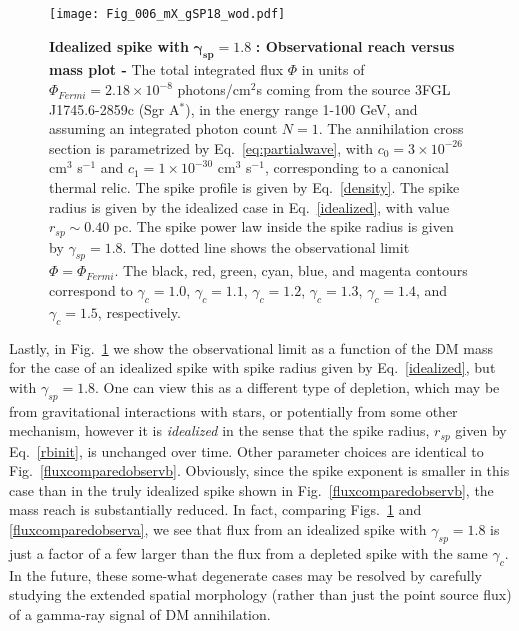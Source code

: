 \documentclass[11pt]{article}
\begin{document}
  \begin{figure}[ht]
  \centering
  {\texttt{[image: Fig\_006\_mX\_gSP18\_wod.pdf]}}
    \caption{\textbf{Idealized spike with} $\mathbf{\gamma_{sp} = 1.8}$ \textbf{: Observational reach versus mass plot - } The total integrated flux $\Phi$ in units of  $ \Phi_{Fermi} = 2.18 \times 10^{-8}$ photons/cm$^2$s coming from the source 3FGL J1745.6-2859c (Sgr A$^*$), in the energy range 1-100 GeV, and assuming an integrated photon count $N=1$. The annihilation cross section is parametrized by Eq.~\ref{eq:partialwave}, with $c_0 = 3 \times 10^{-26}$ cm$^{3}$ s$^{-1}$ and $c_1 = 1 \times 10^{-30}$ cm$^{3}$ s$^{-1}$, corresponding to a canonical thermal relic. The spike profile is given by Eq.~\ref{density}. The spike radius is given by the idealized case in Eq.~\ref{idealized}, with value $r_{sp} \sim 0.40$ pc. The spike power law inside the spike radius is given by $\gamma_{sp} = 1.8$. The dotted line shows the observational limit $\Phi = \Phi_{Fermi}$.  The black, red, green, cyan, blue, and magenta contours correspond to $\gamma_c = 1.0$, $\gamma_c = 1.1$, $\gamma_c = 1.2$, $\gamma_c = 1.3$,  $\gamma_c = 1.4$, and  $\gamma_c = 1.5$, respectively.}
    \label{fluxcomparedobservc}
\end{figure}

Lastly, in Fig.~\ref{fluxcomparedobservc} we show the observational limit as a function of the DM mass for the case of an idealized spike with spike radius given by Eq.~\ref{idealized}, but with $\gamma_{sp} = 1.8$.  One can view this as a different type of depletion, which may be from gravitational interactions with stars, or potentially from some other mechanism, however it is {\it idealized} in the sense that the spike radius, $r_{sp}$ given by Eq.~\ref{rbinit}, is unchanged over time. Other parameter choices are identical to Fig.~\ref{fluxcomparedobservb}. 
Obviously, since the spike exponent is smaller in this case than in the truly idealized spike shown in Fig.~\ref{fluxcomparedobservb}, the mass reach is substantially reduced. In fact, comparing Figs.~\ref{fluxcomparedobservc} and \ref{fluxcomparedobserva}, we see that flux from an idealized spike with $\gamma_{sp}=1.8$ is just a factor of a few larger than the flux from a depleted spike with the same $\gamma_c$.  In the future, these some-what degenerate cases may be resolved by carefully studying the extended spatial morphology (rather than just the point source flux) of a gamma-ray signal of DM annihilation.
\end{document}
